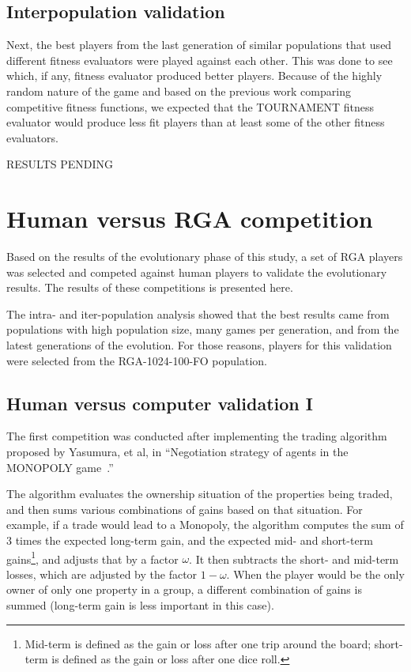 \subsection{Interpopulation validation} \label{6_interpopValidation}

Next, the best players from the last generation of similar populations that used
different fitness evaluators were played against each other. This was done to
see which, if any, fitness evaluator produced better players. Because of the
highly random nature of the game and based on the previous work comparing
competitive fitness functions, we expected that the TOURNAMENT fitness evaluator
would produce less fit players than at least some of the other fitness
evaluators.

RESULTS PENDING

\section{Human versus RGA competition}

Based on the results of the evolutionary phase of this study, a set of RGA
players was selected and competed against human players to validate the
evolutionary results. The results of these competitions is presented here.

The intra- and iter-population analysis showed that the best results came from
populations with high population size, many games per generation, and from the
latest generations of the evolution. For those reasons, players for this
validation were selected from the RGA-1024-100-FO population.

\subsection{Human versus computer validation I}\label{6_humanVRGA1}

The first competition was conducted after implementing the trading algorithm
proposed by Yasumura, et al, in ``Negotiation strategy of agents in the MONOPOLY
game~\cite{Yasumura2001Negotiate}.''

The algorithm evaluates the ownership situation of the properties being traded,
and then sums various combinations of gains based on that situation. For
example, if a trade would lead to a Monopoly, the algorithm computes the sum of
3 times the expected long-term gain, and the expected mid- and short-term
gains\footnote{Mid-term is defined as the gain or loss after one trip around the
board; short-term is defined as the gain or loss after one dice roll.}, and
adjusts that by a factor \(\omega\). It then subtracts the short- and mid-term
losses, which are adjusted by the factor \(1-\omega\). When the player would be
the only owner of only one property in a group, a different combination of
gains is summed (long-term gain is less important in this case).

